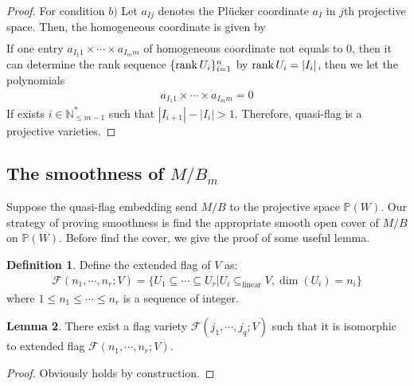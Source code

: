\documentclass[10pt,UTF8]{article}
\theoremstyle{definition}
\renewcommand{\qed}{\rightline{$\qedsymbol$}}
\renewcommand{\emptyset}{\varnothing}
\newtheorem{definition}{Definition}[section]
\newtheorem{lemma}[definition]{Lemma}
\newtheorem*{proof}{Proof}
\begin{document}
\begin{proof}
  For condition $b)$ Let $a_{Ij}$ denotes the Plücker coordinate $a_I$ in $j$th projective space. Then, the homogeneous coordinate is given by
  \begin{align*}
  [a_{\emptyset 1}\times\cdots\times a_{\emptyset m}:\cdots:a_{{I_1}1}\times\cdots\times a_{{I_m}m} :\cdots]
  \end{align*}
  If one entry $a_{{I_1}1}\times\cdots\times a_{{I_m}m} $
  of homogeneous coordinate not equals to 0, then it can determine the rank sequence $ \{\operatorname{rank}{U_i}\}_{i=1}^n$
  by $\operatorname{rank}{U_i} = |I_i|$, then we let the polynomials 
  \begin{align*}
    a_{{I_1}1}\times\cdots\times a_{{I_m}m} = 0
  \end{align*}
  If exists $i\in \mathbb{N}^*_{\le m-1}$ such that $|I_{i+1}|-|I_{i}|>1$.
  Therefore, quasi-flag is a projective varieties.
\end{proof}

\subsection{The smoothness of $M/B_m$}
Suppose the quasi-flag embedding  send $M/B$ to the projective space $\mathbb{P}(W)$.
Our strategy of proving smoothness is find the appropriate smooth open cover of $M/B$ on $\mathbb{P}(W)$.
Before find the cover, we give the proof of some useful lemma.

\begin{definition}
  Define the extended flag  of $V$ as:
  \begin{align*}
    \mathcal{F}(n_1,\cdots,n_r;V) = \{U_1\subseteq \cdots\subseteq U_r|U_i\subseteq_{\text{linear}} V ,\dim(U_i)=n_i\}
  \end{align*}
  where $1\le n_1\le\cdots \le n_r$ is a sequence of integer.
\end{definition}

\begin{lemma}
  There exist a flag variety $\mathcal{F}(j_1,\cdots,j_q;V)$ such that it is isomorphic to 
  extended flag $ \mathcal{F}(n_1,\cdots,n_r;V)$. \label{exfs}
\end{lemma}
\begin{proof}
  Obviously holds by construction. 
  \qed
\end{proof}
\end{document}
